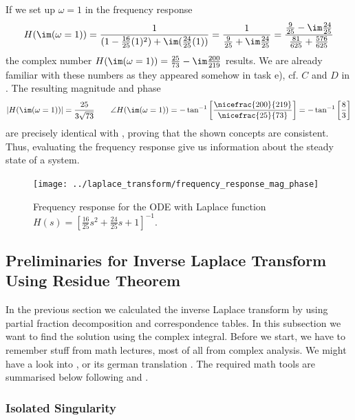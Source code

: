 If we set up $\omega=1$ in the frequency response
\begin{align}
H(\im(\omega=1))
= \frac{1}{ (1 -\frac{16}{25} (1)^2) + \im (\frac{24}{25} (1))}
= \frac{1}{ \frac{9}{25} + \im \frac{24}{25}}
= \frac{\frac{9}{25} - \im \frac{24}{25}}{ \frac{81}{625} + \frac{576}{625}}
\end{align}
the complex number $H(\im(\omega=1)) = \frac{25}{73} - \im \frac{200}{219}$ results.
%
We are already familiar with these numbers as they appeared somehow in task e), cf.
$C$ and $D$ in .
%
The resulting magnitude and phase
\begin{equation}
|H(\im(\omega=1))| = \frac{25}{3 \sqrt{73}}
\qquad
\angle H(\im(\omega=1)) = -\tan^{-1}
\left[\frac{\nicefrac{200}{219}}{\nicefrac{25}{73}}\right]
= -\tan^{-1}\left[\frac{8}{3}\right]
\end{equation}
are precisely identical with ,
proving that the shown concepts are consistent.
%
Thus, evaluating the frequency response give us information about the steady
state of a system.
%
\begin{figure}[h!]
\centering
\texttt{[image: ../laplace\_transform/frequency\_response\_mag\_phase]}
\caption{Frequency response for the ODE with Laplace function
$H(s) = \left[ \frac{16}{25} s^2 + \frac{24}{25} s + 1 \right]^{-1}$.}
\label{fig:frequency_response_mag_phase}
\end{figure}
\newpage
\subsection{Preliminaries for Inverse Laplace Transform Using Residue Theorem }
%
%
In the previous section we calculated the inverse Laplace transform by using partial fraction decomposition and correspondence tables. In this subsection we want to find the solution using the complex integral.
Before we start, we have to remember stuff from math lectures, most of all from complex analysis.
%
We might have a look into \cite{Strang2007}, or its german translation \cite{Strang2010}.
%
The required math tools are summarised below following \cite{Fritzsche2019} and \cite{UlrichWeber2017}.

\subsubsection{Isolated Singularity}


